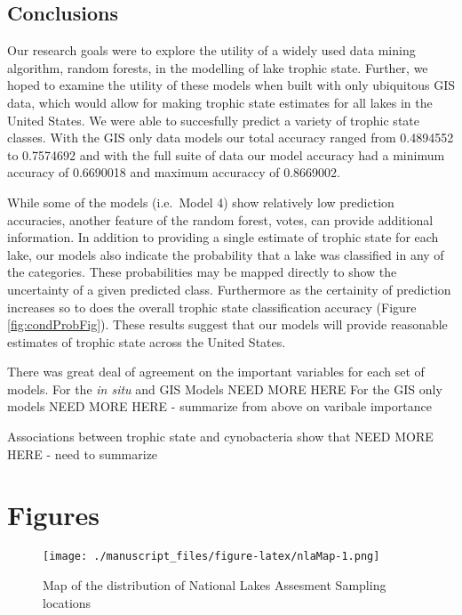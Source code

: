 \documentclass[11pt,]{article}
\begin{document}
\subsection{Conclusions}\label{conclusions}

Our research goals were to explore the utility of a widely used data
mining algorithm, random forests, in the modelling of lake trophic
state. Further, we hoped to examine the utility of these models when
built with only ubiquitous GIS data, which would allow for making
trophic state estimates for all lakes in the United States. We were able
to succesfully predict a variety of trophic state classes. With the GIS
only data models our total accuracy ranged from 0.4894552 to 0.7574692
and with the full suite of data our model accuracy had a minimum
accuracy of 0.6690018 and maximum accuraccy of 0.8669002.

While some of the models (i.e.~Model 4) show relatively low prediction
accuracies, another feature of the random forest, votes, can provide
additional information. In addition to providing a single estimate of
trophic state for each lake, our models also indicate the probability
that a lake was classified in any of the categories. These probabilities
may be mapped directly to show the uncertainty of a given predicted
class. Furthermore as the certainity of prediction increases so to does
the overall trophic state classification accuracy (Figure
\ref{fig:condProbFig}). These results suggest that our models will
provide reasonable estimates of trophic state across the United States.

There was great deal of agreement on the important variables for each
set of models. For the \emph{in situ} and GIS Models NEED MORE HERE For
the GIS only models NEED MORE HERE - summarize from above on varibale
importance

Associations between trophic state and cynobacteria show that NEED MORE
HERE - need to summarize

\newpage

\section{Figures}\label{figures}

\begin{figure}[htbp]
\centering
\texttt{[image: ./manuscript\_files/figure-latex/nlaMap-1.png]}
\caption{Map of the distribution of National Lakes Assesment Sampling
locations\label{fig:nlaMap}}
\end{figure}
\end{document}
